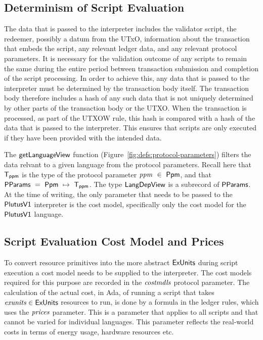 \subsection{Determinism of Script Evaluation}
\label{sec:determinism}

The data that is passed to the interpreter
includes the validator script, the redeemer, possibly a datum from the UTxO, information about the transaction that
embeds the script, any relevant ledger data, and any relevant protocol parameters.
It is necessary for the validation outcome of any scripts to remain the same during the entire
period between transaction
submission and completion of the script processing.
%
In order to achieve this,
any data that is passed to the interpreter must be determined by the transaction body itself.
The transaction body therefore includes a hash of any such data that is not uniquely determined by other parts of the transaction body or the UTXO.
When the transaction is processed, as part of the UTXOW rule, this hash is compared with a hash of the data that is passed to the interpreter. This
ensures that scripts are only executed if they have been provided with the intended data.

The $\mathsf{getLanguageView}$ function (Figure~\ref{fig:defs:protocol-parameters}) filters the data relvant
to a given language from the protocol parameters. Recall here that $\mathsf{T_{ppm}}$ is the type of the
protocol parameter $\mathit{ppm}~\in~\mathsf{Ppm}$, and that $\mathsf{PParams}~=~\mathsf{Ppm}~\mapsto~\mathsf{T_{ppm}}$.
The type $\mathsf{LangDepView}$ is a subrecord of $\mathsf{PParams}$.
%
At the time of writing, the only parameter that needs to be passed to the $\mathsf{PlutusV1}$
interpreter is the cost model, specifically only the cost model for the $\mathsf{PlutusV1}$ language.

\subsection{Script Evaluation Cost Model and Prices}
\label{sec:cost-mod}

To convert resource primitives into the
more abstract $\mathsf{ExUnits}$ during script execution a cost model needs to be supplied to the interpreter.
The cost models required for this purpose are recorded in the $\mathit{costmdls}$ protocol parameter.
%
The calculation of the actual cost, in Ada, of running
a script that takes $\mathit{exunits} \in \mathsf{ExUnits}$ resources to run,
is done by a formula in the ledger rules, which uses the
$\mathit{prices}$ parameter. This is a parameter that applies to all
scripts and that cannot be varied for individual languages. This parameter
reflects the real-world costs in terms of energy usage, hardware resources etc.

